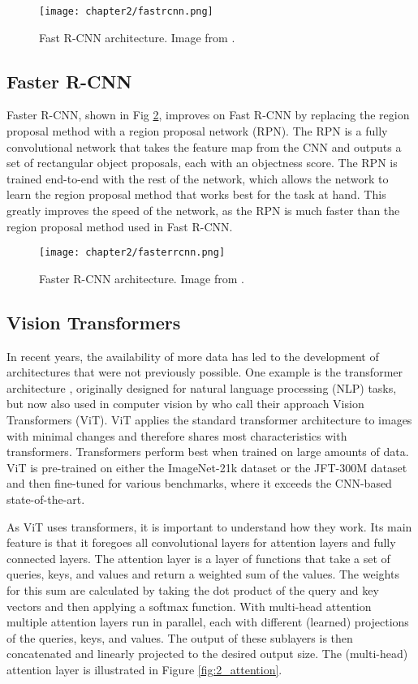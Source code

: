 \begin{figure}[H]
	\centering
	\texttt{[image: chapter2/fastrcnn.png]}
	\caption{\label{fig:2_fastrcnn} Fast R-CNN architecture. Image from \citet{fastrcnn}.}
\end{figure}

\subsection{Faster R-CNN \cite{fasterrcnn}}
Faster R-CNN, shown in Fig \ref{fig:2_fasterrcnn}, improves on Fast R-CNN by replacing the region proposal method with a region proposal network (RPN). The RPN is a fully convolutional network that takes the feature map from the CNN and outputs a set of rectangular object proposals, each with an objectness score. The RPN is trained end-to-end with the rest of the network, which allows the network to learn the region proposal method that works best for the task at hand. This greatly improves the speed of the network, as the RPN is much faster than the region proposal method used in Fast R-CNN.

\begin{figure}[H]
	\centering
	\texttt{[image: chapter2/fasterrcnn.png]}
	\caption{\label{fig:2_fasterrcnn} Faster R-CNN architecture. Image from \citet{fasterrcnn}.}
\end{figure}

\subsection{Vision Transformers \cite{vit}}
In recent years, the availability of more data has led to the development of architectures that were not previously possible. One example is the transformer architecture \cite{transformers}, originally designed for natural language processing (NLP) tasks, but now also used in computer vision by \citet{vit} who call their approach Vision Transformers (ViT). ViT applies the standard transformer architecture to images with minimal changes and therefore shares most characteristics with transformers. Transformers perform best when trained on large amounts of data. ViT is pre-trained on either the ImageNet-21k \cite{ImageNet} dataset or the JFT-300M dataset and then fine-tuned for various benchmarks, where it exceeds the CNN-based state-of-the-art. 

As ViT uses transformers, it is important to understand how they work. Its main feature is that it foregoes all convolutional layers for attention layers and fully connected layers. The attention layer is a layer of functions that take a set of queries, keys, and values and return a weighted sum of the values. The weights for this sum are calculated by taking the dot product of the query and key vectors and then applying a softmax function. With multi-head attention multiple attention layers run in parallel, each with different (learned) projections of the queries, keys, and values. The output of these sublayers is then concatenated and linearly projected to the desired output size. The (multi-head) attention layer is illustrated in Figure \ref{fig:2_attention}.


